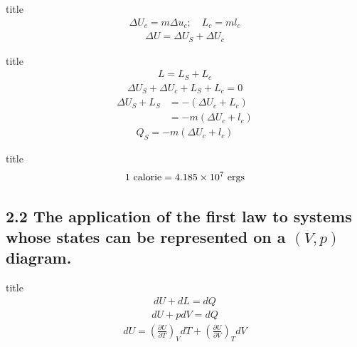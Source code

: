 \documentclass[dvipdfmx, 10pt, aspectratio = 169]{beamer}
\begin{document}
\begin{frame}{title}
	\begin{align}
		\Delta U_c = m \Delta u_c; \quad L_c = ml_c
	\end{align}
	\begin{align*}
		\Delta U = \Delta U_S + \Delta U_c
	\end{align*}
\end{frame}

\begin{frame}{title}
	\begin{align*}
		L = L_S + L_c
	\end{align*}
	\begin{align*}
		\Delta U_S + \Delta U_c + L_S + L_c = 0
	\end{align*}
	\begin{align*}
		\Delta U_S + L_S &= -(\Delta U_c + L_c) \\
		&= -m(\Delta U_c + l_c)
	\end{align*}
	\begin{align}
		Q_S = -m(\Delta U_c + l_c)
	\end{align}
\end{frame}

\begin{frame}{title}
	\begin{align}
		1 \ {\rm calorie} = 4.185 \times 10^7 \ {\rm ergs}
	\end{align}
\end{frame}

\subsection{2.2 The application of the first law to systems whose states can be represented on a $(V, p)$ diagram.}

\begin{frame}{title}
	\begin{align}
		dU + dL = dQ
	\end{align}
	\begin{align}
		dU + pdV = dQ
	\end{align}
	\begin{align*}
		dU = \left( \frac{\partial U}{\partial T} \right)_V dT + \left( \frac{\partial U}{\partial V} \right)_T dV
	\end{align*}
\end{frame}
\end{document}
